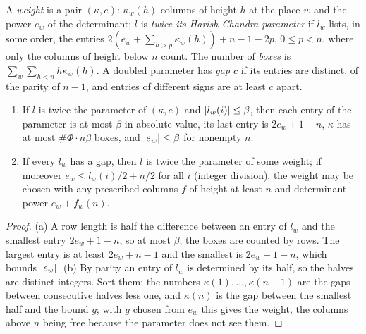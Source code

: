 A \emph{weight} is a pair $(\kappa,e)$: $\kappa_w(h)$ columns of height $h$ at the place $w$ and the power $e_w$ of the determinant; $l$ is \emph{twice its Harish-Chandra parameter} if $l_w$ lists, in some order, the entries
$2(e_w+\sum_{h>p}\kappa_w(h))+n-1-2p$, $0\le p<n$, where only the columns of height below $n$ count. The number of \emph{boxes} is $\sum_w\sum_{h<n}h\kappa_w(h)$. A doubled parameter has \emph{gap $c$} if its entries are distinct, of the
parity of $n-1$, and entries of different signs are at least $c$ apart.

\begin{lemma}\label{lem:regular-weights}
\begin{enumerate}[label=\textup{(\alph*)}]
\item If $l$ is twice the parameter of $(\kappa,e)$ and $\lvert l_w(i)\rvert\le\beta$, then each entry of the parameter is at most $\beta$ in absolute value, its last entry is $2e_w+1-n$, $\kappa$ has at most $\#\Phi\cdot n\beta$ boxes, and $\lvert e_w\rvert\le\beta$ for
nonempty $n$.
\item If every $l_w$ has a gap, then $l$ is twice the parameter of some weight; if moreover $e_w\le l_w(i)/2+n/2$ for all $i$ (integer division), the weight may be chosen with any prescribed columns $f$ of height at least $n$ and determinant
power $e_w+f_w(n)$.
\end{enumerate}
\end{lemma}

\begin{proof}
(a) A row length is half the difference between an entry of $l_w$ and the smallest entry $2e_w+1-n$, so at most $\beta$; the boxes are counted by rows. The largest entry is at least $2e_w+n-1$ and the smallest is $2e_w+1-n$, which bounds
$\lvert e_w\rvert$. (b) By parity an entry of $l_w$ is determined by its half, so the halves are distinct integers. Sort them; the numbers $\kappa(1),\dots,\kappa(n-1)$ are the gaps between consecutive halves less one, and $\kappa(n)$ is the gap
between the smallest half and the bound $g$; with $g$ chosen from $e_w$ this gives the weight, the columns above $n$ being free because the parameter does not see them.
\end{proof}

